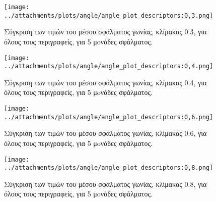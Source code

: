  \newpage
 
 
 \begin{figure}[ht!]
\begin{minipage}[b]{1.0\linewidth}
\centering
\texttt{[image: ../attachments/plots/angle/angle\_plot\_descriptors:0,3.png]}
\caption{Σύγκριση των τιμών του μέσου σφάλματος γωνίας, κλίμακας 0.3, για όλους τους περιγραφείς, για 5 μoνάδες σφάλματος.}
\label{fig:plot_scale_des_0.3_high}
\end{minipage}
 \end{figure} 
 \begin{figure}[ht!]
\begin{minipage}[b]{1.0\linewidth}
\centering
\texttt{[image: ../attachments/plots/angle/angle\_plot\_descriptors:0,4.png]}
\caption{Σύγκριση των τιμών του μέσου σφάλματος γωνίας, κλίμακας 0.4, για όλους τους περιγραφείς, για 5 μoνάδες σφάλματος.}
\label{fig:plot_scale_des_0.4_high}
\end{minipage}

 \end{figure} 
 
 \newpage
 
 
 \begin{figure}[ht!]
\begin{minipage}[b]{1.0\linewidth}
\centering
\texttt{[image: ../attachments/plots/angle/angle\_plot\_descriptors:0,6.png]}
\caption{Σύγκριση των τιμών του μέσου σφάλματος γωνίας, κλίμακας 0.6, για όλους τους περιγραφείς, για 5 μoνάδες σφάλματος.}
\label{fig:plot_scale_des_0.6_high}
\end{minipage}
 \end{figure} 
 \begin{figure}[ht!]
\begin{minipage}[b]{1.0\linewidth}
\centering
\texttt{[image: ../attachments/plots/angle/angle\_plot\_descriptors:0,8.png]}
\caption{Σύγκριση των τιμών του μέσου σφάλματος γωνίας, κλίμακας 0.8, για όλους τους περιγραφείς, για 5 μoνάδες σφάλματος.}
\label{fig:plot_scale_des_0.8_high}
\end{minipage}

 \end{figure} 
 
 \newpage
 
